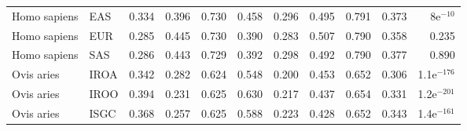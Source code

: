 \begin{longtable}{llrrrrrrrrr}
        Homo sapiens &                       EAS &                              0.334 &                               0.396 &                 0.730 &                 0.458 &                              0.296 &                               0.495 &                 0.791 &                 0.373 &    8e$^{-10}$ \\
        Homo sapiens &                       EUR &                              0.285 &                               0.445 &                 0.730 &                 0.390 &                              0.283 &                               0.507 &                 0.790 &                 0.358 &         0.235 \\
        Homo sapiens &                       SAS &                              0.286 &                               0.443 &                 0.729 &                 0.392 &                              0.298 &                               0.492 &                 0.790 &                 0.377 &         0.890 \\
          Ovis aries &                      IROA &                              0.342 &                               0.282 &                 0.624 &                 0.548 &                              0.200 &                               0.453 &                 0.652 &                 0.306 & 1.1e$^{-176}$ \\
          Ovis aries &                      IROO &                              0.394 &                               0.231 &                 0.625 &                 0.630 &                              0.217 &                               0.437 &                 0.654 &                 0.331 & 1.2e$^{-201}$ \\
          Ovis aries &                      ISGC &                              0.368 &                               0.257 &                 0.625 &                 0.588 &                              0.223 &                               0.428 &                 0.652 &                 0.343 & 1.4e$^{-161}$ \\
\end{longtable}

